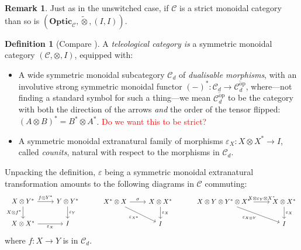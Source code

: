\documentclass[11pt,a4paper]{article}
\theoremstyle{plain}
\theoremstyle{definition}
\newtheorem{definition}[theorem]{Definition}
\newtheorem{remark}[theorem]{Remark}
\newcommand{\C}{\mathscr{C}}
\newcommand{\Optic}{\mathbf{Optic}}
\newcommand{\switched}{\mathbin{\tilde{\otimes}}}
\newcommand{\op}{\mathrm{op}}
\newcommand{\todo}[1]{\textcolor{red}{\small #1}}
\begin{document}
\begin{remark}
Just as in the unswitched case, if $\C$ is a strict monoidal category than so is $(\Optic_\C, \switched, (I, I))$.
\end{remark}



\begin{definition}[Compare {\cite[Definition 5.1]{CoherenceForLenses}}]
A \emph{teleological category is} a symmetric monoidal category $(\C, \otimes, I)$, equipped with:
\begin{itemize}
\item A wide symmetric monoidal subcategory $\C_d$ of \emph{dualisable morphisms}, with an involutive strong symmetric monoidal functor $(-)^* : \C_d \to \overline{\C_d^\op}$, where---not finding a standard symbol for such a thing---we mean $\overline{\C_d^\op}$ to be the category with both the direction of the arrows \emph{and} the order of the tensor flipped: $(A \otimes B)^* = B^* \otimes A^*$. \todo{Do we want this to be strict?}
\item A symmetric monoidal extranatural family of morphisms $\varepsilon_X : X \otimes X^* \to I$, called \emph{counits}, natural with respect to the morphisms in $\C_d$.
\end{itemize}
\end{definition}
Unpacking the definition, $\varepsilon$ being a symmetric monoidal extranatural transformation amounts to the following diagrams in $\C$ commuting:
\[
\begin{tikzcd}
X \otimes Y^* \ar[r, "f \otimes Y^*"]  \ar[d, "X \otimes f^*", swap] & Y \otimes Y^* \ar[d, "\varepsilon_Y"] \\
X \otimes X^* \ar[r, "\varepsilon_X", swap] & I
\end{tikzcd} \hspace{1cm}
\begin{tikzcd}
X^* \otimes X \ar[r, "\sigma"]  \ar[dr, "\varepsilon_{X^*}", swap] & X \otimes X^* \ar[d, "\varepsilon_X"] \\
& I
\end{tikzcd} \hspace{1cm}
\begin{tikzcd}
X \otimes Y \otimes Y^* \otimes X^* \ar[r, "X \otimes \varepsilon_Y \otimes X^*"]  \ar[dr, "\varepsilon_{X \otimes Y}", swap] & X \otimes X^* \ar[d, "\varepsilon_X"] \\
& I
\end{tikzcd}
\] 
where $f : X \to Y$ is in $\C_d$.
\end{document}
